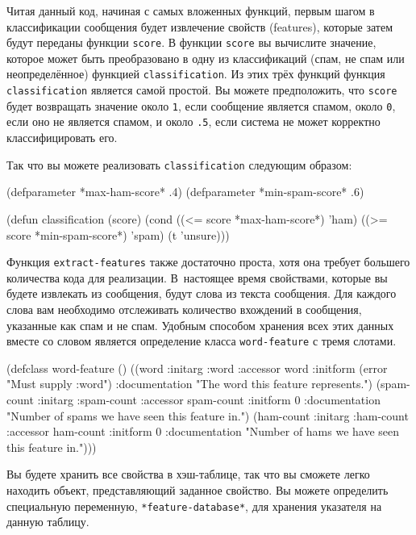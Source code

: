 Читая данный код, начиная с самых вложенных функций, первым шагом в классификации сообщения
будет извлечение свойств (features), которые затем будут переданы функции \lstinline{score}.  В
функции \lstinline{score} вы вычислите значение, которое может быть преобразовано в одну из
классификаций (спам, не спам или неопределённое) функцией \lstinline{classification}.  Из этих
трёх функций функция \lstinline{classification} является самой простой. Вы можете
предположить, что \lstinline{score} будет возвращать значение около \lstinline{1}, если сообщение
является спамом, около \lstinline{0}, если оно не является спамом, и около \lstinline{.5}, если
система не может корректно классифицировать его.

Так что вы можете реализовать \lstinline{classification} следующим образом:

\begin{myverb}
(defparameter *max-ham-score* .4)
(defparameter *min-spam-score* .6)

(defun classification (score)
  (cond
    ((<= score *max-ham-score*) 'ham)
    ((>= score *min-spam-score*) 'spam)
    (t 'unsure)))
\end{myverb}

Функция \lstinline{extract-features} также достаточно проста, хотя она требует большего
количества кода для реализации.  В~настоящее время свойствами, которые вы будете
извлекать из сообщения, будут слова из текста сообщения.  Для каждого слова вам необходимо
отслеживать количество вхождений в сообщения, указанные как спам и не спам.  Удобным
способом хранения всех этих данных вместе со словом является определение класса
\lstinline{word-feature} с тремя слотами.

\begin{myverb}
(defclass word-feature ()
  ((word       
    :initarg :word
    :accessor word
    :initform (error "Must supply :word")
    :documentation "The word this feature represents.")
   (spam-count
    :initarg :spam-count
    :accessor spam-count
    :initform 0
    :documentation "Number of spams we have seen this feature in.")
   (ham-count
    :initarg :ham-count
    :accessor ham-count
    :initform 0
    :documentation "Number of hams we have seen this feature in.")))
\end{myverb}

Вы будете хранить все свойства в хэш-таблице, так что вы сможете легко находить объект,
представляющий заданное свойство.  Вы можете определить специальную переменную,
\lstinline{*feature-database*}, для хранения указателя на данную таблицу.


